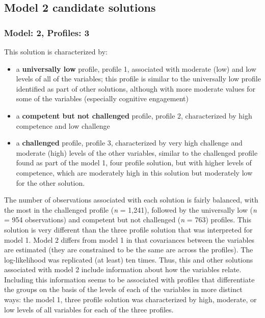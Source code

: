 \documentclass[]{msu-thesis}
\providecommand{\tightlist}{%
  \setlength{\itemsep}{0pt}\setlength{\parskip}{0pt}}
\theoremstyle{definition}
\theoremstyle{definition}
\theoremstyle{definition}
\theoremstyle{remark}
\begin{document}
\subsection{Model 2 candidate
solutions}\label{model-2-candidate-solutions}

\subsubsection{Model: 2, Profiles: 3}\label{model-2-profiles-3}

This solution is characterized by:

\begin{itemize}
\tightlist
\item
  a \textbf{universally low} profile, profile 1, associated with
  moderate (low) and low levels of all of the variables; this profile is
  similar to the universally low profile identified as part of other
  solutions, although with more moderate values for some of the
  variables (especially cognitive engagement)
\item
  a \textbf{competent but not challenged} profile, profile 2,
  characterized by high competence and low challenge
\item
  a \textbf{challenged} profile, profile 3, characterized by very high
  challenge and moderate (high) levels of the other variables, similar
  to the challenged profile found as part of the model 1, four profile
  solution, but with higher levels of competence, which are moderately
  high in this solution but moderately low for the other solution.
\end{itemize}

The number of observations associated with each solution is fairly
balanced, with the most in the challenged profile (\emph{n} = 1,241),
followed by the universally low (\emph{n} = 954 observations) and
competent but not challenged (\emph{n} = 763) profiles. This solution is
very different than the three profile solution that was interpreted for
model 1. Model 2 differs from model 1 in that covariances between the
variables are estimated (they are constrained to be the same are across
the profiles). The log-likelihood was replicated (at least) ten times.
Thus, this and other solutions associated with model 2 include
information about how the variables relate. Including this information
seems to be associated with profiles that differentiate the groups on
the basis of the levels of each of the variables in more distinct ways:
the model 1, three profile solution was characterized by high, moderate,
or low levels of all variables for each of the three profiles.
\end{document}
